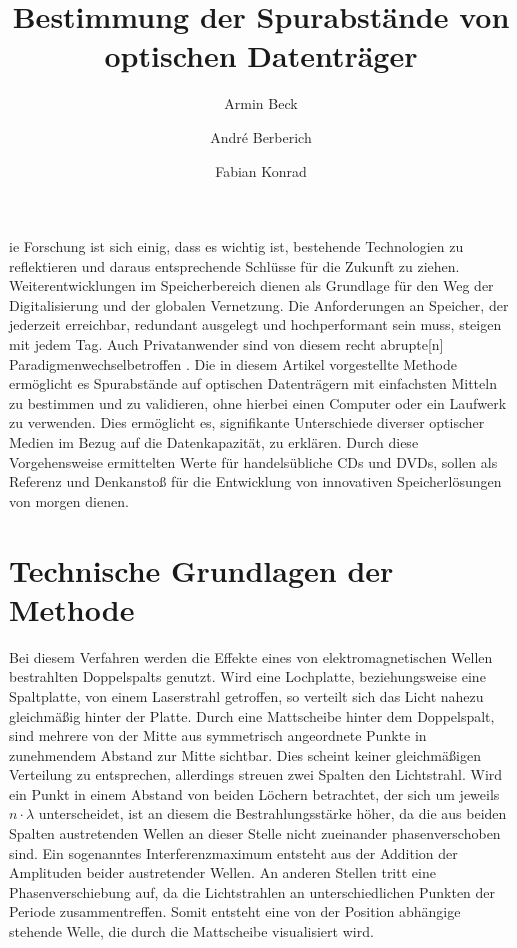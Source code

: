 \documentclass[9pt,twocolumn,twoside]{pnas-new}
\title{Bestimmung der Spurabstände von optischen Datenträger}
\author[a]{Armin Beck}
\author[a]{André Berberich}
\author[a]{Fabian Konrad}
\affil[a]{Student der DHBW Mosbach}
\begin{document}
\verticaladjustment{-2pt}

\maketitle
\thispagestyle{firststyle}

ie Forschung ist sich einig, dass es wichtig ist, bestehende Technologien zu reflektieren und daraus entsprechende Schlüsse für die Zukunft zu ziehen. Weiterentwicklungen im Speicherbereich dienen als Grundlage für den Weg der Digitalisierung und der globalen Vernetzung. 
Die Anforderungen an Speicher, der jederzeit erreichbar, redundant ausgelegt und hochperformant sein muss, steigen mit jedem Tag.
Auch Privatanwender sind von diesem \glqq recht abrupte[n] Paradigmenwechsel\grqq \space betroffen \cite[Heft 10/2012 S.102]{CT1990}.
Die in diesem Artikel vorgestellte Methode ermöglicht es Spurabstände auf optischen Datenträgern mit einfachsten Mitteln zu bestimmen und zu validieren, ohne hierbei einen Computer oder ein Laufwerk zu verwenden. Dies ermöglicht es, signifikante Unterschiede diverser optischer Medien im Bezug auf die Datenkapazität, zu erklären. Durch diese Vorgehensweise ermittelten Werte für handelsübliche CDs und DVDs, sollen als Referenz und Denkanstoß für die Entwicklung von innovativen Speicherlösungen von morgen dienen.

\section*{Technische Grundlagen der Methode}
Bei diesem Verfahren werden die Effekte eines von elektromagnetischen Wellen bestrahlten Doppelspalts genutzt.
 Wird eine Lochplatte, beziehungsweise eine Spaltplatte, von einem Laserstrahl getroffen, so verteilt sich das Licht nahezu gleichmäßig hinter der Platte.
 Durch eine Mattscheibe hinter dem Doppelspalt, sind mehrere von der Mitte aus symmetrisch angeordnete Punkte in zunehmendem Abstand zur Mitte sichtbar.
Dies scheint keiner gleichmäßigen Verteilung zu entsprechen, allerdings streuen zwei Spalten den Lichtstrahl.
Wird ein Punkt in einem Abstand von beiden Löchern betrachtet, der sich um jeweils \begin{math}n\cdot\lambda\end{math} unterscheidet, ist an diesem die Bestrahlungsstärke höher, da die aus beiden Spalten austretenden Wellen an dieser Stelle nicht zueinander phasenverschoben sind. Ein sogenanntes Interferenzmaximum entsteht aus der Addition der Amplituden beider austretender Wellen. An anderen Stellen tritt eine Phasenverschiebung auf, da die Lichtstrahlen an unterschiedlichen Punkten der Periode zusammentreffen. Somit entsteht eine von der Position abhängige stehende Welle, die durch die Mattscheibe visualisiert wird.
\end{document}
